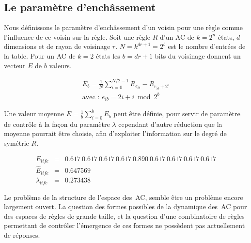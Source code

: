 \subsection*{Le param\`etre d'ench\^assement}

Nous d\'efinissons le param\`etre d'ench\^assement d'un voisin pour une
r\`egle comme l'influence de ce voisin sur la r\`egle. %
Soit une r\`egle $R$ d'un AC de $k = 2^n$ \'etats, $d$ dimensions et de
rayon de voisinage $r$. %
$N = k^{dr+1} = 2^b$ est le nombre d'entr\'ees de la table. %
Pour un AC de $k = 2$ \'etats les $b = dr+1$ bits du voisinage donnent
un vecteur $E$ de $b$ valeurs.

\begin{eqnarray}
\label{rs-eq1}
        E_{b} = \frac{1}{N} \sum_{i = 0}^{N/2 - 1} R_{e_{ib}} - R_{e_{ib} + 2^b} \\
        \mbox{avec : } e_{ib} = 2i + i \bmod 2^b \nonumber
\end{eqnarray}

Une valeur moyenne $E = \frac{1}{b} \sum_{i = 0}^{b} E_b$ peut \^etre
d\'efinie, pour servir de param\`etre de contr\^ole \`a la fa\c{c}on du
param\`etre $\lambda$ cependant d'autre r\'eduction que la moyenne
pourrait \^etre choisie, afin d'exploiter l'information sur le degr\'e de
sym\'etrie $R$.

\begin{eqnarray}
        E_{life} & = &
        {0.617\ 0.617\ 0.617\ 0.617\ 0.890\ 0.617\ 0.617\ 0.617\ 0.617} \nonumber \\
        \hat{E}_{life} & = & 0.647569 \nonumber \\
        \lambda_{life} & = & 0.273438 \nonumber
\end{eqnarray}

Le probl\`eme de la structure de l'espace des~AC, semble \^etre un
probl\`eme encore largement ouvert. %
La question des formes possibles de la dynamique des~AC pour des
espaces de r\`egles de grande taille, et la question d'une combinatoire
de r\`egles permettant de contr\^oler l'\'emergence de ces formes ne
poss\`edent pas actuellement de r\'eponses.

